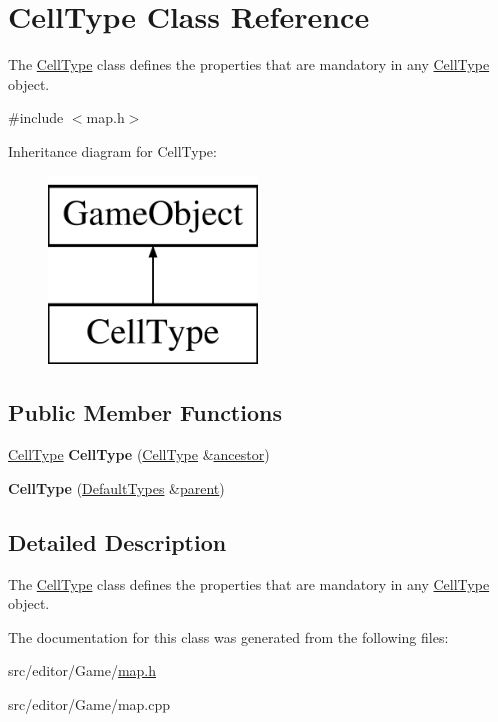 \hypertarget{class_cell_type}{\section{\-Cell\-Type \-Class \-Reference}
\label{class_cell_type}
}


\-The \hyperlink{class_cell_type}{\-Cell\-Type} class defines the properties that are mandatory in any \hyperlink{class_cell_type}{\-Cell\-Type} object.  




{\ttfamily \#include $<$map.\-h$>$}

\-Inheritance diagram for \-Cell\-Type\-:\begin{figure}[H]
\begin{center}
\leavevmode
\includegraphics[height=5.000000cm]{class_cell_type}
\end{center}
\end{figure}
\subsection*{\-Public \-Member \-Functions}
\begin{DoxyCompactItemize}
\item 
\hypertarget{class_cell_type_a547d7a2e47edfe2e081ad3e876658e67}{\hyperlink{class_cell_type}{\-Cell\-Type} {\bfseries \-Cell\-Type} (\hyperlink{class_cell_type}{\-Cell\-Type} \&\hyperlink{class_inheritable_object_ac87a3c55ca4be252c527a29fe162bb15}{ancestor})}\label{class_cell_type_a547d7a2e47edfe2e081ad3e876658e67}

\item 
\hypertarget{class_cell_type_a4af772be829a307264a5392655b8bbc1}{{\bfseries \-Cell\-Type} (\hyperlink{class_default_types}{\-Default\-Types} \&\hyperlink{class_game_object_af3deaf39cde23c189765634e32e95bb4}{parent})}\label{class_cell_type_a4af772be829a307264a5392655b8bbc1}

\end{DoxyCompactItemize}


\subsection{\-Detailed \-Description}
\-The \hyperlink{class_cell_type}{\-Cell\-Type} class defines the properties that are mandatory in any \hyperlink{class_cell_type}{\-Cell\-Type} object. 

\-The documentation for this class was generated from the following files\-:\begin{DoxyCompactItemize}
\item 
src/editor/\-Game/\hyperlink{map_8h}{map.\-h}\item 
src/editor/\-Game/map.\-cpp\end{DoxyCompactItemize}
